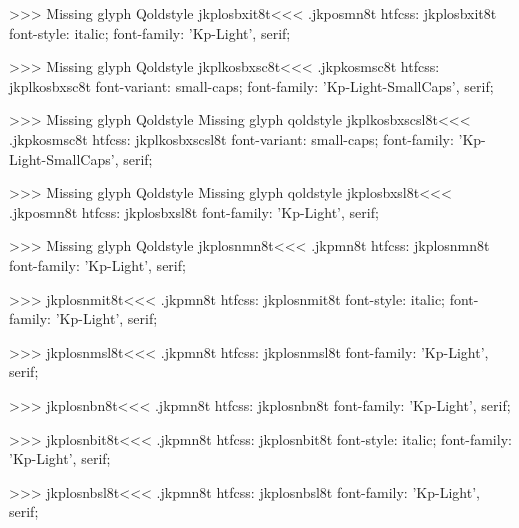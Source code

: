 >>>
Missing glyph	Qoldstyle
\<jkplosbxit8t\><<<
.jkposmn8t
htfcss:  jkplosbxit8t  font-style: italic; font-family: 'Kp-Light', serif;

>>>
Missing glyph	Qoldstyle
\<jkplkosbxsc8t\><<<
.jkpkosmsc8t
htfcss:  jkplkosbxsc8t  font-variant: small-caps; font-family: 'Kp-Light-SmallCaps', serif;

>>>
Missing glyph	Qoldstyle
Missing glyph	qoldstyle
\<jkplkosbxscsl8t\><<<
.jkpkosmsc8t
htfcss:  jkplkosbxscsl8t  font-variant: small-caps; font-family: 'Kp-Light-SmallCaps', serif;

>>>
Missing glyph	Qoldstyle
Missing glyph	qoldstyle
\<jkplosbxsl8t\><<<
.jkposmn8t
htfcss:  jkplosbxsl8t  font-family: 'Kp-Light', serif;

>>>
Missing glyph	Qoldstyle
\<jkplosnmn8t\><<<
.jkpmn8t
htfcss:  jkplosnmn8t  font-family: 'Kp-Light', serif;

>>>
\<jkplosnmit8t\><<<
.jkpmn8t
htfcss:  jkplosnmit8t  font-style: italic; font-family: 'Kp-Light', serif;

>>>
\<jkplosnmsl8t\><<<
.jkpmn8t
htfcss:  jkplosnmsl8t  font-family: 'Kp-Light', serif;

>>>
\<jkplosnbn8t\><<<
.jkpmn8t
htfcss:  jkplosnbn8t  font-family: 'Kp-Light', serif;

>>>
\<jkplosnbit8t\><<<
.jkpmn8t
htfcss:  jkplosnbit8t  font-style: italic; font-family: 'Kp-Light', serif;

>>>
\<jkplosnbsl8t\><<<
.jkpmn8t
htfcss:  jkplosnbsl8t  font-family: 'Kp-Light', serif;

